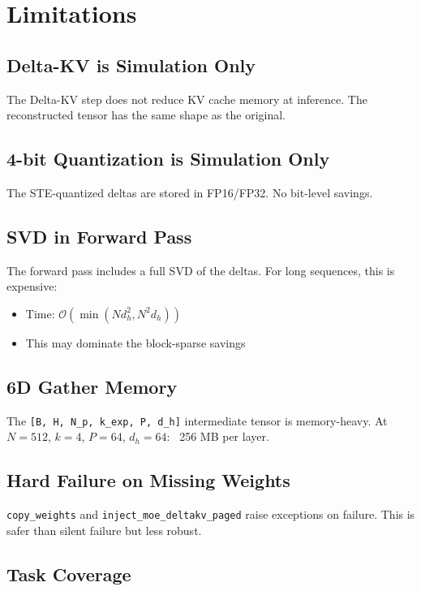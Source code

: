 \section{Limitations}

\subsection{Delta-KV is Simulation Only}

The Delta-KV step does not reduce KV cache memory at inference. The 
reconstructed tensor has the same shape as the original.

\subsection{4-bit Quantization is Simulation Only}

The STE-quantized deltas are stored in FP16/FP32. No bit-level savings.

\subsection{SVD in Forward Pass}

The forward pass includes a full SVD of the deltas. For long sequences, 
this is expensive:
\begin{itemize}
\item Time: $\mathcal{O}(\min(N d_h^2, N^2 d_h))$
\item This may dominate the block-sparse savings

\end{itemize}
\subsection{6D Gather Memory}

The \texttt{[B, H, N\_p, k\_exp, P, d\_h]} intermediate tensor is memory-heavy. At 
$N = 512$, $k = 4$, $P = 64$, $d_h = 64$: ~256 MB per layer.

\subsection{Hard Failure on Missing Weights}

\texttt{copy\_weights} and \texttt{inject\_moe\_deltakv\_paged} raise exceptions on failure. 
This is safer than silent failure but less robust.

\subsection{Task Coverage}

